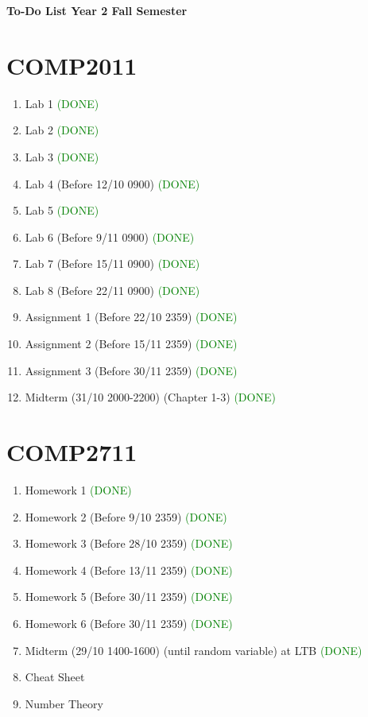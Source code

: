 \documentclass[11pt]{article}
\begin{document}
\begin{center}
\vspace{0.6cm}
{\Large \bf To-Do List Year 2 Fall Semester}
\vspace{0.3cm}
\end{center}

\section{COMP2011}
\begin{enumerate}
    \item Lab 1 \textcolor{green}{(DONE)}
    \item Lab 2 \textcolor{green}{(DONE)}
    \item Lab 3 \textcolor{green}{(DONE)}
    \item Lab 4 (Before 12/10 0900) \textcolor{green}{(DONE)}
    \item Lab 5 \textcolor{green}{(DONE)}
    \item Lab 6 (Before 9/11 0900) \textcolor{green}{(DONE)}
    \item Lab 7 (Before 15/11 0900) \textcolor{green}{(DONE)}
    \item Lab 8 (Before 22/11 0900) \textcolor{green}{(DONE)}
    \item Assignment 1 (Before 22/10 2359) \textcolor{green}{(DONE)}
    \item Assignment 2 (Before 15/11 2359) \textcolor{green}{(DONE)}
    \item Assignment 3 (Before 30/11 2359) \textcolor{green}{(DONE)}
    \item Midterm (31/10 2000-2200) (Chapter 1-3) \textcolor{green}{(DONE)}
\end{enumerate}

\section{COMP2711}
\begin{enumerate}
    \item Homework 1 \textcolor{green}{(DONE)}
    \item Homework 2 (Before 9/10 2359) \textcolor{green}{(DONE)}
    \item Homework 3 (Before 28/10 2359) \textcolor{green}{(DONE)}
    \item Homework 4 (Before 13/11 2359) \textcolor{green}{(DONE)}
    \item Homework 5 (Before 30/11 2359) \textcolor{green}{(DONE)}
    \item Homework 6 (Before 30/11 2359) \textcolor{green}{(DONE)}
    \item Midterm (29/10 1400-1600) (until random variable) at LTB \textcolor{green}{(DONE)}
    \item Cheat Sheet
    \item Number Theory
\end{enumerate}
\end{document}

